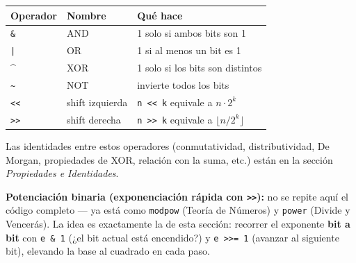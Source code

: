 \begin{center}
\begin{tabular}{|l|l|l|}
\hline
\textbf{Operador} & \textbf{Nombre} & \textbf{Qué hace} \\
\hline
\texttt{\&} & AND & 1 solo si ambos bits son 1 \\
\texttt{|} & OR & 1 si al menos un bit es 1 \\
\textasciicircum{} & XOR & 1 solo si los bits son distintos \\
\texttt{\textasciitilde{}} & NOT & invierte todos los bits \\
\texttt{<{}<} & shift izquierda & \texttt{n <{}< k} equivale a \(n \cdot 2^k\) \\
\texttt{>{}>} & shift derecha & \texttt{n >{}> k} equivale a \(\lfloor n / 2^k \rfloor\) \\
\hline
\end{tabular}
\end{center}

Las identidades entre estos operadores (conmutatividad, distributividad, De Morgan, propiedades de XOR, relación con la suma, etc.) están en la sección \textit{Propiedades e Identidades}.

\textbf{Potenciación binaria (exponenciación rápida con \texttt{>{}>}):} no se repite aquí el código completo — ya está como \texttt{modpow} (Teoría de Números) y \texttt{power} (Divide y Vencerás). La idea es exactamente la de esta sección: recorrer el exponente \textbf{bit a bit} con \texttt{e \&\ 1} (¿el bit actual está encendido?) y \texttt{e >{}>= 1} (avanzar al siguiente bit), elevando la base al cuadrado en cada paso.
